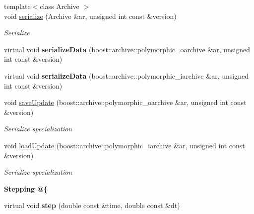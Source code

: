 \begin{DoxyCompactItemize}
\item 
{\footnotesize template$<$class Archive $>$ }\\void \hyperlink{classNeb_1_1Actor_1_1Base_a1b1e7cf679c2cb84e532deed6a2ec90c}{serialize} (\-Archive \&ar, unsigned int const \&version)
\begin{DoxyCompactList}\small\item\em \-Serialize \end{DoxyCompactList}\item 
\hypertarget{classNeb_1_1Actor_1_1Base_a910522bc6cc99e63fda53c9c46555204}{virtual void {\bfseries serialize\-Data} (boost\-::archive\-::polymorphic\-\_\-oarchive \&ar, unsigned int const \&version)}\label{classNeb_1_1Actor_1_1Base_a910522bc6cc99e63fda53c9c46555204}

\item 
\hypertarget{classNeb_1_1Actor_1_1Base_aea6b73147535dde24fa95ec2f82c759f}{virtual void {\bfseries serialize\-Data} (boost\-::archive\-::polymorphic\-\_\-iarchive \&ar, unsigned int const \&version)}\label{classNeb_1_1Actor_1_1Base_aea6b73147535dde24fa95ec2f82c759f}

\item 
\hypertarget{classNeb_1_1Actor_1_1Base_aa4edb51f746f8d68d9fe39898e93d6e9}{void \hyperlink{classNeb_1_1Actor_1_1Base_aa4edb51f746f8d68d9fe39898e93d6e9}{save\-Update} (boost\-::archive\-::polymorphic\-\_\-oarchive \&ar, unsigned int const \&version)}\label{classNeb_1_1Actor_1_1Base_aa4edb51f746f8d68d9fe39898e93d6e9}

\begin{DoxyCompactList}\small\item\em \-Serialize specialization \end{DoxyCompactList}\item 
\hypertarget{classNeb_1_1Actor_1_1Base_a188f918586281aa28c3cc31044614aba}{void \hyperlink{classNeb_1_1Actor_1_1Base_a188f918586281aa28c3cc31044614aba}{load\-Update} (boost\-::archive\-::polymorphic\-\_\-iarchive \&ar, unsigned int const \&version)}\label{classNeb_1_1Actor_1_1Base_a188f918586281aa28c3cc31044614aba}

\begin{DoxyCompactList}\small\item\em \-Serialize specialization \end{DoxyCompactList}\end{DoxyCompactItemize}
\begin{Indent}{\bf \-Stepping @\{}\par
\begin{DoxyCompactItemize}
\item 
\hypertarget{classNeb_1_1Actor_1_1Base_ae06b2570b603d98996e8c629c946962b}{virtual void {\bfseries step} (double const \&time, double const \&dt)}\label{classNeb_1_1Actor_1_1Base_ae06b2570b603d98996e8c629c946962b}

\end{DoxyCompactItemize}
\end{Indent}

